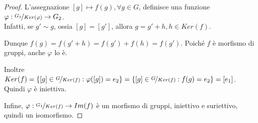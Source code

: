 \documentclass[../main.tex]{subfiles}
\begin{document}
\begin{proof}
    L'assegnazione $[g] \mapsto f(g), \forall g \in  G$, definisce una funzione $\varphi : \nicefrac{G_1}{Ker(\varphi)}
        \rightarrow G_2$.\\
    Infatti, se $g' \sim g$, ossia $[g]  = [g']$, allora $g = g' + h , h \in Ker(f)$.

    Dunque $f(g) = f(g' + h) = f(g') + f(h) = f(g')$. Poiché $f$ è morfismo di gruppi, anche $\varphi$ lo è.

    Inoltre $Ker(f) = \{[g] \in \nicefrac{G}{Ker(f)} : \varphi([g]) = e_2\}=\{[g] \in  \nicefrac{G}{Ker(f)} : f(g) = e_2\} = {[e_1]}$. Quindi $\varphi$ è iniettiva.

    Infine, $ \varphi : \nicefrac{G_1}{Ker(f)} \rightarrow Im(f)$ è un morfismo di gruppi, iniettivo e suriettivo, quindi un isomorfismo.
\end{proof}
\end{document}
